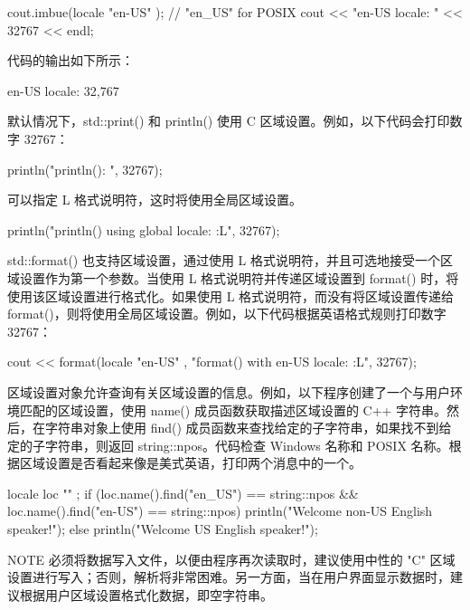 \begin{cpp}
cout.imbue(locale { "en-US" }); // "en_US" for POSIX
cout << "en-US locale: " << 32767 << endl;
\end{cpp}

代码的输出如下所示：

\begin{shell}
en-US locale: 32,767
\end{shell}

默认情况下，std::print() 和 println() 使用 C 区域设置。例如，以下代码会打印数字 32767：

\begin{cpp}
println("println(): {}", 32767);
\end{cpp}

可以指定 L 格式说明符，这时将使用全局区域设置。

\begin{cpp}
println("println() using global locale: {:L}", 32767);
\end{cpp}

std::format() 也支持区域设置，通过使用 L 格式说明符，并且可选地接受一个区域设置作为第一个参数。当使用 L 格式说明符并传递区域设置到 format() 时，将使用该区域设置进行格式化。如果使用 L 格式说明符，而没有将区域设置传递给 format()，则将使用全局区域设置。例如，以下代码根据英语格式规则打印数字 32767：

\begin{cpp}
cout << format(locale { "en-US" }, "format() with en-US locale: {:L}", 32767);
\end{cpp}

区域设置对象允许查询有关区域设置的信息。例如，以下程序创建了一个与用户环境匹配的区域设置，使用 name() 成员函数获取描述区域设置的 C++ 字符串。然后，在字符串对象上使用 find() 成员函数来查找给定的子字符串，如果找不到给定的子字符串，则返回 string::npos。代码检查 Windows 名称和 POSIX 名称。根据区域设置是否看起来像是美式英语，打印两个消息中的一个。

\begin{cpp}
locale loc { "" };
if (loc.name().find("en_US") == string::npos &&
    loc.name().find("en-US") == string::npos) {
    println("Welcome non-US English speaker!");
} else {
    println("Welcome US English speaker!");
}
\end{cpp}

\begin{myNotic}{NOTE}
必须将数据写入文件，以便由程序再次读取时，建议使用中性的 "C" 区域设置进行写入；否则，解析将非常困难。另一方面，当在用户界面显示数据时，建议根据用户区域设置格式化数据，即空字符串。
\end{myNotic}

